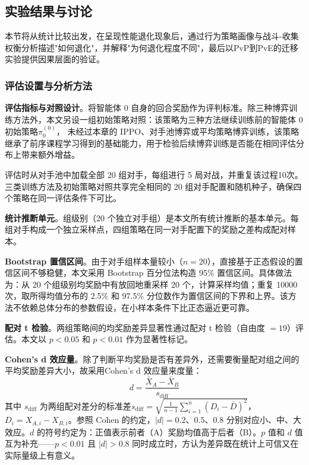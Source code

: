 \documentclass[12pt, a4paper, UTF8]{ctexart}
\numberwithin{equation}{section}
\begin{document}
\subsection{实验结果与讨论}

本节将从统计比较出发，在呈现性能退化现象后，通过行为策略画像与战斗-收集权衡分析描述"如何退化"，并解释"为何退化程度不同"，最后以PvP到PvE的迁移实验提供因果层面的验证。

\subsubsection{评估设置与分析方法}

\textbf{评估指标与对照设计}。将智能体 0 自身的回合奖励作为评判标准。除三种博弈训练方法外，本文另设一组初始策略对照：该策略为三种方法继续训练前的智能体 0 初始策略$\pi_0^{(0)}$，
未经过本章的 IPPO、对手池博弈或平均策略博弈训练，该策略继承了前序课程学习得到的基础能力，用于检验后续博弈训练是否能在相同评估分布上带来额外增益。

评估时从对手池中加载全部 20 组对手，每组进行 5 局对战，并重复该过程10次。三类训练方法及初始策略对照共享完全相同的 20 组对手配置和随机种子，确保四个策略在同一评估条件下可比。

\textbf{统计推断单元}。组级别（20 个独立对手组）是本文所有统计推断的基本单元。每组对手构成一个独立采样点，四组策略在同一对手配置下的奖励之差构成配对样本。

\textbf{Bootstrap 置信区间}。由于对手组样本量较小（$n=20$），直接基于正态假设的置信区间不够稳健，本文采用 Bootstrap 百分位法构造 95\% 置信区间。具体做法为：从 20 个组级别均奖励中有放回地重采样 20 个，计算采样均值；重复 10000 次，取所得均值分布的 2.5\% 和 97.5\% 分位数作为置信区间的下界和上界。该方法不依赖总体分布的参数假设，在小样本条件下比正态逼近更可靠。

\textbf{配对 t 检验}。两组策略间的均奖励差异显著性通过配对 t 检验（自由度 $=19$）评估。本文以 $p<0.05$ 和 $p<0.01$ 作为显著性标记。

\textbf{Cohen's d 效应量}。除了判断平均奖励是否有差异外，还需要衡量配对组之间的平均奖励差异大小，故采用Cohen's d 效应量来度量：
\begin{equation}
  d = \frac{\bar{X}_A - \bar{X}_B}{s_{\text{diff}}}
  \label{eq:cohens_d}
\end{equation}
其中 $s_{\text{diff}}$ 为两组配对差分的标准差$s_{\text{diff}} = \sqrt{\frac{1}{n-1}\sum_{i=1}^{n}(D_i - \bar{D})^2}$，$D_i = X_{A,i} - X_{B,i}$。参照 Cohen 的约定，$|d|=0.2$、$0.5$、$0.8$ 分别对应小、中、大效应。$d$ 的符号约定为：正值表示前者（A）奖励均值高于后者（B）。$p$ 值和 $d$ 值互为补充——$p<0.01$ 且 $|d|>0.8$ 同时成立时，方认为差异既在统计上可信又在实际量级上有意义。
\end{document}
